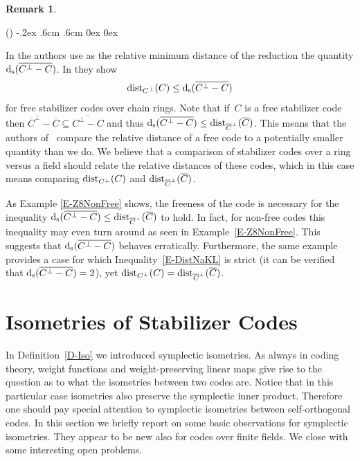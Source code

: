 \documentclass[11pt]{article}
\theoremstyle{definition}
\newtheorem{rem}[theo]{Remark}
\numberwithin{equation}{section}
\newcommand{\ds}{\mbox{${\rm d}_{\rm s}$}}
\newcommand{\ov}[1]{\mbox{$\overline{#1}$}}
\newcommand{\dist}{\textup{dist}}
\newcounter{alp}
\newenvironment{alphalist}{\begin{list}{(\alph{alp})\hfill}{\usecounter{alp}
     \topsep-.2ex \labelwidth.6cm \leftmargin.6cm \labelsep0cm
     \rightmargin0cm \parsep0ex \itemsep0ex}}{\end{list}}
\begin{document}
\begin{rem}\label{L-NK}
\begin{alphalist}
\item In \cite{NaKl12} the authors use as the relative minimum distance of the reduction the quantity $\ds{(\ov{C^{\perp} -C})}$. In \cite[Thm.~16]{NaKl12} they show
       \begin{equation}\label{E-DistNaKL}
       \dist_{\small{C^{\perp}}}(C) \leq \ds{(\ov{C^{\perp} -C})}
       \end{equation}
       for free stabilizer codes over chain rings.
       Note that if~$C$ is a free stabilizer code then $\ov{C}^{\perp}-\ov{C} \subseteq \ov{C^{\perp}-C}$ and thus $\ds(\ov{C^{\perp}-C})\leq\dist_{\small{\overline{C}^\perp}}(\ov{C})$.
       This means that the authors of~\cite{NaKl12} compare the relative distance of a free code to a potentially smaller quantity than we do.
      We believe that a comparison of stabilizer codes over a ring versus a field should relate the relative distances of these codes, which in this case means comparing $\dist_{C^\perp}(C)$
      and $\dist_{\small{\overline{C}^\perp}}(\ov{C})$.
\item As Example \ref{E-Z8NonFree} shows, the freeness of the code is necessary for the inequality $ \ds(\ov{C^{\perp}-C})\leq\dist_{\small{\overline{C}^\perp}}(\ov{C})$ to hold.
In fact, for non-free codes this inequality may even turn around as seen in Example~\ref{E-Z8NonFree}.
      This suggests that $\ds(\ov{C^{\perp}-C})$ behaves erratically.
       Furthermore, the same example provides a case for which Inequality~\eqref{E-DistNaKL} is strict (it can be verified that $\ds(\ov{C^{\perp}-C})=2$),
       yet $\dist_{\small{C^{\perp}}}(C) = \dist_{\small{\overline{C}^\perp}}(\ov{C})$.
\end{alphalist}
\end{rem}

\section{Isometries of Stabilizer Codes}\label{SS-Iso}

In Definition~\ref{D-Iso} we introduced symplectic isometries.
As  always in coding theory, weight functions and weight-preserving linear maps   give rise to the question as to what the isometries between two codes are.
Notice that in this particular case isometries also preserve the symplectic inner product.
Therefore one should pay special attention to symplectic isometries between self-orthogonal codes.
In this section we briefly report on some basic observations for symplectic isometries.
They appear to be new also for codes over finite fields. We close with some interesting open problems.
\end{document}
